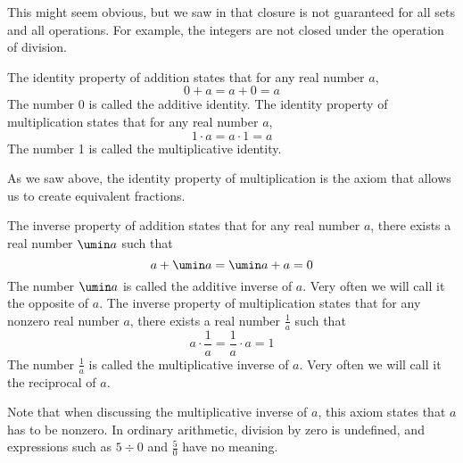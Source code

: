 This might seem obvious, but we saw in  that closure is not guaranteed for all sets and all operations. For example, the integers are not closed under the operation of division.

\begin{boxeddefex}
The \gls{identity property of addition} states that for any real number $a$, \[0 + a = a + 0 = a\] The number 0 is called the \gls{additive identity}.
\tcblower
The \gls{identity property of multiplication} states that for any real number $a$, \[1 \cdot a = a \cdot 1 = a\] The number 1 is called the \gls{multiplicative identity}.
\end{boxeddefex}

As we saw above, the identity property of multiplication is the axiom that allows us to create equivalent fractions.

\begin{boxeddefex}
The \gls{inverse property of addition} states that for any real number $a$, there exists a real number $\umin a$ such that \[a + \umin a = \umin a + a = 0\] The number $\umin a$ is called the \gls{additive inverse} of $a$. Very often we will call it the \gls{opposite} of $a$.
\tcblower
The \gls{inverse property of multiplication} states that for any nonzero real number $a$, there exists a real number $\frac{1}{a}$ such that \[a \cdot \frac{1}{a} = \frac{1}{a} \cdot a = 1\] The number $\frac{1}{a}$ is called the \gls{multiplicative inverse} of $a$. Very often we will call it the \gls{reciprocal} of $a$.
\end{boxeddefex}


Note that when discussing the multiplicative inverse of $a$, this axiom states that $a$ has to be nonzero. In ordinary arithmetic, division by zero is undefined, and expressions such as $5 \div 0$ and $\frac{5}{0}$ have no meaning.

